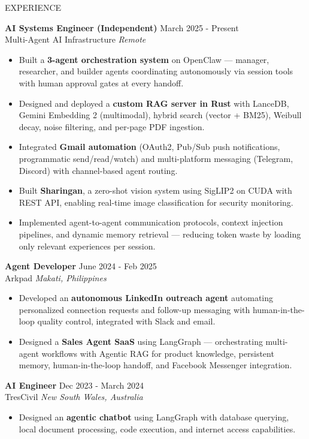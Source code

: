 \documentclass{resume} %
\begin{document}
\begin{rSection}{EXPERIENCE} 

\textbf{AI Systems Engineer (Independent)} \hfill March 2025 - Present\\
Multi-Agent AI Infrastructure \hfill \textit{Remote}
 \begin{itemize}
 \itemsep -3pt {} 
 \item Built a \textbf{3-agent orchestration system} on OpenClaw — manager, researcher, and builder agents coordinating autonomously via session tools with human approval gates at every handoff.
 \item Designed and deployed a \textbf{custom RAG server in Rust} with LanceDB, Gemini Embedding 2 (multimodal), hybrid search (vector + BM25), Weibull decay, noise filtering, and per-page PDF ingestion.
 \item Integrated \textbf{Gmail automation} (OAuth2, Pub/Sub push notifications, programmatic send/read/watch) and multi-platform messaging (Telegram, Discord) with channel-based agent routing.
 \item Built \textbf{Sharingan}, a zero-shot vision system using SigLIP2 on CUDA with REST API, enabling real-time image classification for security monitoring.
 \item Implemented agent-to-agent communication protocols, context injection pipelines, and dynamic memory retrieval — reducing token waste by loading only relevant experiences per session.
 \end{itemize}

\textbf{Agent Developer} \hfill June 2024 - Feb 2025\\
Arkpad \hfill \textit{Makati, Philippines}
 \begin{itemize}
 \itemsep -3pt {} 
 \item Developed an \textbf{autonomous LinkedIn outreach agent} automating personalized connection requests and follow-up messaging with human-in-the-loop quality control, integrated with Slack and email.
 \item Designed a \textbf{Sales Agent SaaS} using LangGraph — orchestrating multi-agent workflows with Agentic RAG for product knowledge, persistent memory, human-in-the-loop handoff, and Facebook Messenger integration.
 \end{itemize}
 
\textbf{AI Engineer} \hfill Dec 2023 - March 2024\\
TresCivil \hfill \textit{New South Wales, Australia}
 \begin{itemize}
 \itemsep -3pt {} 
 \item Designed an \textbf{agentic chatbot} using LangGraph with database querying, local document processing, code execution, and internet access capabilities.
 \end{itemize}


\end{rSection}
\end{document}

